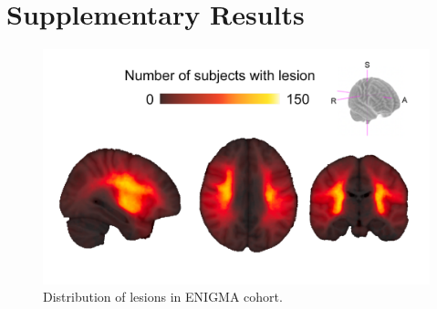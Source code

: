\documentclass[10pt]{article}
\newcommand{\beginsupplement}{%
\setcounter{table}{0}
\renewcommand{\thetable}{S\arabic{table}}%
\setcounter{figure}{0}
\renewcommand{\thefigure}{S\arabic{figure}}%
}
\begin{document}
\clearpage



\printbibliography
\section*{Supplementary Results}

\beginsupplement
\begin{figure}[ht]
\centering
\includegraphics[width=0.8\linewidth]{figures/distribution_lesions.png}
\caption{Distribution of lesions in ENIGMA cohort.}
\label{lesiondist}
\end{figure}
\end{document}
